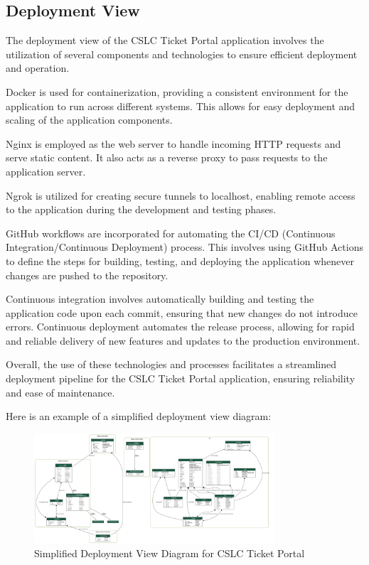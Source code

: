 \documentclass[oneside,openany,obeyspaces]{book}
\begin{document}
\begin{flushleft}
    \section{Deployment View}

    The deployment view of the CSLC Ticket Portal application involves the utilization of several components and technologies to ensure efficient deployment and operation.

    Docker is used for containerization, providing a consistent environment for the application to run across different systems. This allows for easy deployment and scaling of the application components.

    Nginx is employed as the web server to handle incoming HTTP requests and serve static content. It also acts as a reverse proxy to pass requests to the application server.

    Ngrok is utilized for creating secure tunnels to localhost, enabling remote access to the application during the development and testing phases.

    GitHub workflows are incorporated for automating the CI/CD (Continuous Integration/Continuous Deployment) process. This involves using GitHub Actions to define the steps for building, testing, and deploying the application whenever changes are pushed to the repository.

    Continuous integration involves automatically building and testing the application code upon each commit, ensuring that new changes do not introduce errors. Continuous deployment automates the release process, allowing for rapid and reliable delivery of new features and updates to the production environment.

    Overall, the use of these technologies and processes facilitates a streamlined deployment pipeline for the CSLC Ticket Portal application, ensuring reliability and ease of maintenance.

    Here is an example of a simplified deployment view diagram:

    \begin{figure}
        \centering
        \includegraphics[width=0.8\textwidth]{img/erd.png}
        \caption{Simplified Deployment View Diagram for CSLC Ticket Portal}
        \label{Deployment View}
    \end{figure}



\end{flushleft}
\end{document}
